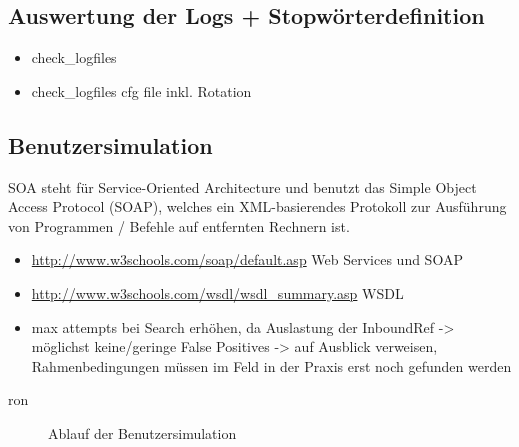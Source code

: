\subsection{Auswertung der Logs + Stopwörterdefinition}
\begin{itemize}
\item check\_logfiles
\item check\_logfiles cfg file inkl. Rotation
\end{itemize}

\subsection{Benutzersimulation}
\gls{SOA} steht für Service-Oriented Architecture und benutzt das Simple Object Access Protocol (\gls{SOAP}), welches ein \gls{XML}-basierendes Protokoll zur Ausführung von Programmen / Befehle auf entfernten Rechnern ist.

\begin{itemize}
\item \url{http://www.w3schools.com/soap/default.asp} Web Services und SOAP
\item \url{http://www.w3schools.com/wsdl/wsdl_summary.asp} WSDL
\item max attempts bei Search erhöhen, da Auslastung der InboundRef -> möglichst keine/geringe False Positives -> auf Ausblick verweisen, Rahmenbedingungen müssen im Feld in der Praxis erst noch gefunden werden
\end{itemize}ron

\begin{figure}[ht]
	\centering
		\caption{Ablauf der Benutzersimulation}
		\label{usersim}
\end{figure}

